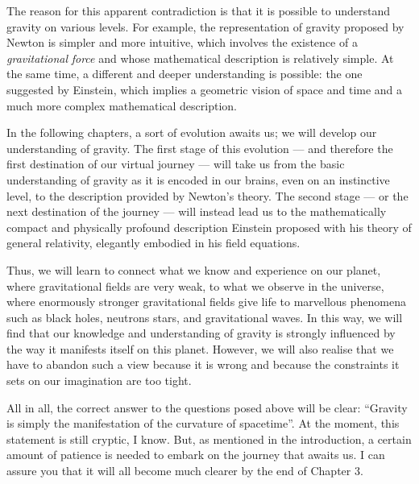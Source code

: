 The reason for this apparent contradiction is that it is possible to understand gravity
on various levels. For example, the representation of gravity proposed by Newton
is simpler and more intuitive, which involves the existence of a
\emph{gravitational} \emph{force} and whose mathematical
description is relatively simple. At the same time, a different and deeper understanding
is possible: the one suggested by Einstein, which implies a geometric vision of space
and time and a much more complex mathematical description.

In the following chapters, a sort of evolution awaits us; we will develop our
understanding of gravity. The first stage of this evolution --- and therefore the first
destination of our virtual journey --- will take us from the basic understanding of
gravity as it is encoded in our brains, even on an instinctive level, to the description
provided by Newton's theory. The second stage --- or the next
destination of the journey --- will instead lead us to the mathematically compact and
physically profound description Einstein proposed with his theory of general
relativity,
elegantly embodied in his field equations.

Thus, we will learn to connect what we know and experience on our planet, where
gravitational fields are very weak, to what we observe in the universe, where enormously
stronger gravitational fields give life to marvellous phenomena such as black holes,
neutrons stars, and gravitational
waves. In this way, we will find
that our knowledge and understanding of gravity is strongly influenced by the way it
manifests itself on this planet. However, we will also realise that we have to abandon
such a view because it is wrong and because the constraints it sets on our imagination
are too tight.

All in all, the correct answer to the questions posed above will be clear: ``Gravity is
simply the manifestation of the curvature of spacetime''. At the moment, this statement
is still cryptic, I know. But, as mentioned in the introduction, a certain amount of
patience is needed to embark on the journey that awaits us. I can assure you that it
will all become much clearer by the end of Chapter 3.
